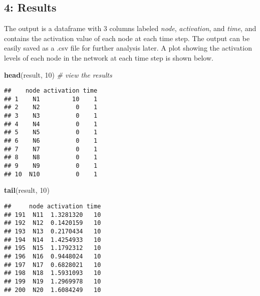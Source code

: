 \documentclass[]{article}
\newenvironment{Shaded}{\begin{snugshade}}{\end{snugshade}}
\newcommand{\KeywordTok}[1]{\textcolor[rgb]{0.13,0.29,0.53}{\textbf{#1}}}
\newcommand{\DecValTok}[1]{\textcolor[rgb]{0.00,0.00,0.81}{#1}}
\newcommand{\CommentTok}[1]{\textcolor[rgb]{0.56,0.35,0.01}{\textit{#1}}}
\newcommand{\NormalTok}[1]{#1}
\begin{document}
\subsection{4: Results}\label{results}

The output is a dataframe with 3 columns labeled \emph{node},
\emph{activation}, and \emph{time}, and contains the activation value of
each node at each time step. The output can be easily saved as a .csv
file for further analysis later. A plot showing the activation levels of
each node in the network at each time step is shown below.

\begin{Shaded}
\begin{Highlighting}[]
\KeywordTok{head}\NormalTok{(result, }\DecValTok{10}\NormalTok{) }\CommentTok{# view the results}
\end{Highlighting}
\end{Shaded}

\begin{verbatim}
##    node activation time
## 1    N1         10    1
## 2    N2          0    1
## 3    N3          0    1
## 4    N4          0    1
## 5    N5          0    1
## 6    N6          0    1
## 7    N7          0    1
## 8    N8          0    1
## 9    N9          0    1
## 10  N10          0    1
\end{verbatim}

\begin{Shaded}
\begin{Highlighting}[]
\KeywordTok{tail}\NormalTok{(result, }\DecValTok{10}\NormalTok{)}
\end{Highlighting}
\end{Shaded}

\begin{verbatim}
##     node activation time
## 191  N11  1.3281320   10
## 192  N12  0.1420159   10
## 193  N13  0.2170434   10
## 194  N14  1.4254933   10
## 195  N15  1.1792312   10
## 196  N16  0.9448024   10
## 197  N17  0.6828021   10
## 198  N18  1.5931093   10
## 199  N19  1.2969978   10
## 200  N20  1.6084249   10
\end{verbatim}
\end{document}
